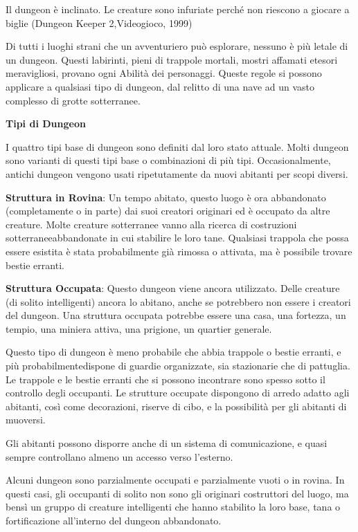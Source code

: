 \documentclass[a4paper,11pt,twoside,openany]{book}
\begin{document}
\label{avventure-nei-dungeon}
\begin{tcolorbox}[enhanced,arc=5pt,boxrule=0.3pt]{Il dungeon è inclinato. Le creature sono infuriate perché non riescono a giocare a biglie (Dungeon Keeper 2,Videogioco, 1999)}\end{tcolorbox}\medskip

Di tutti i luoghi strani che un avventuriero può esplorare, nessuno è più letale di un dungeon. Questi labirinti, pieni di trappole mortali, mostri affamati etesori meravigliosi, provano ogni Abilità dei personaggi. Queste regole si possono applicare a qualsiasi tipo di dungeon, dal relitto di una nave ad un vasto complesso di grotte sotterranee.

\textbf{Tipi di Dungeon}

I quattro tipi base di dungeon sono definiti dal loro stato attuale. Molti dungeon sono varianti di questi tipi base o combinazioni di più tipi. Occasionalmente, antichi dungeon vengono usati ripetutamente da nuovi abitanti per scopi diversi.

\textbf{Struttura in Rovina}: Un tempo abitato, questo luogo è ora abbandonato (completamente o in parte) dai suoi creatori originari ed è occupato da altre creature. Molte creature sotterranee vanno alla ricerca di costruzioni sotterraneeabbandonate in cui stabilire le loro tane. Qualsiasi trappola che possa essere esistita è stata probabilmente già rimossa o attivata, ma è possibile trovare bestie erranti.

\textbf{Struttura Occupata}: Questo dungeon viene ancora utilizzato. Delle creature (di solito intelligenti) ancora lo abitano, anche se potrebbero non essere i creatori del dungeon. Una struttura occupata potrebbe essere una casa, una fortezza, un tempio, una miniera attiva, una prigione, un quartier generale.

Questo tipo di dungeon è meno probabile che abbia trappole o bestie erranti, e più probabilmentedispone di guardie organizzate, sia stazionarie che di pattuglia. Le trappole e le bestie erranti che si possono incontrare sono spesso sotto il controllo degli occupanti. Le strutture occupate dispongono di arredo adatto agli abitanti, così come decorazioni, riserve di cibo, e la possibilità per gli abitanti di muoversi.

Gli abitanti possono disporre anche di un sistema di comunicazione, e quasi sempre
controllano almeno un accesso verso l'esterno.

Alcuni dungeon sono parzialmente occupati e parzialmente vuoti o in rovina. In questi casi, gli occupanti di solito non sono gli originari costruttori del luogo, ma bensì un gruppo di creature intelligenti che hanno stabilito la loro base, tana o fortificazione all'interno del dungeon abbandonato.
\end{document}
